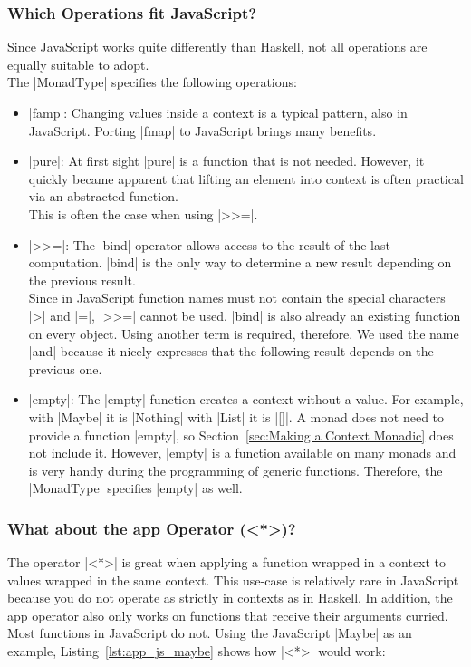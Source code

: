 \subsubsection{Which Operations fit JavaScript?} %
\label{subsub:Which operations fit JavaScript?}
Since JavaScript works quite differently than Haskell, not all operations are
equally suitable to adopt. \\
The |MonadType| specifies the following operations:
\begin{itemize}
  \item |famp|: Changing values inside a context is a typical pattern,
    also in JavaScript. Porting |fmap| to JavaScript brings many benefits.
  \item |pure|: At first sight |pure| is a function that is not needed.
    However, it quickly became apparent that lifting an element into context is
    often practical via an abstracted function. 
    \\ This is often the case when using |>>=|.
  \item |>>=|: The |bind| operator allows access to the result of the last
    computation. |bind| is the only way to determine a new result depending on
    the previous result. \\ Since in JavaScript function names must not contain
    the special characters |>| and |=|, |>>=| cannot be used. |bind| is also
    already an existing function on every object. Using another term is
    required, therefore. We used the name |and| because it nicely expresses
    that the following result depends on the previous one.
  \item |empty|: The |empty| function creates a context without a value. For
    example, with |Maybe| it is |Nothing| with |List| it is |[]|. A monad does
    not need to provide a function |empty|, so Section~\ref{sec:Making a
    Context Monadic} does not include it. However, |empty| is a function
    available on many monads and is very handy during the programming of
    generic functions. Therefore, the |MonadType| specifies |empty| as well.

\end{itemize}
\subsubsection{What about the app Operator (<*>)?} %
\label{sec:Which operations do not fit JavaScript?}
The operator |<*>| is great when applying a function wrapped in a context to
values wrapped in the same context. This use-case is relatively rare in
JavaScript because you do not operate as strictly in contexts as in Haskell. In
addition, the app operator also only works on functions that receive their
arguments curried. Most functions in JavaScript do not. Using the JavaScript
|Maybe| as an example, Listing~\ref{lst:app_js_maybe} shows how |<*>| would
work:

